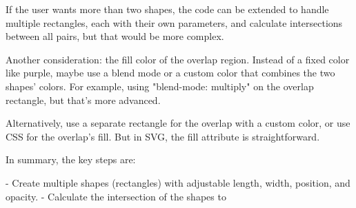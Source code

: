 If the user wants more than two shapes, the code can be extended to handle multiple rectangles, each with their own parameters, and calculate intersections between all pairs, but that would be more complex.

Another consideration: the fill color of the overlap region. Instead of a fixed color like purple, maybe use a blend mode or a custom color that combines the two shapes' colors. For example, using "blend-mode: multiply" on the overlap rectangle, but that's more advanced.

Alternatively, use a separate rectangle for the overlap with a custom color, or use CSS for the overlap's fill. But in SVG, the fill attribute is straightforward.

In summary, the key steps are:

- Create multiple shapes (rectangles) with adjustable length, width, position, and opacity.
- Calculate the intersection of the shapes to